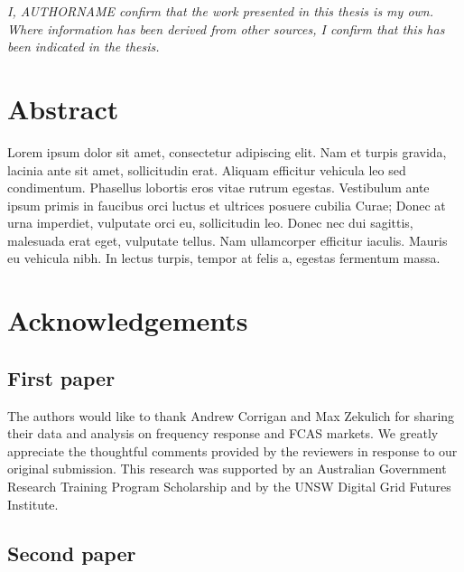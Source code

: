 \documentclass[12pt,a4paper,]{report}
\begin{document}
\vspace*{\fill}

\noindent \textit{
I, AUTHORNAME confirm that the work presented in this thesis is my own. Where information has been derived from other sources, I confirm that this has been indicated in the thesis.
} \vspace*{\fill}  \newpage

\hypertarget{abstract}{%
\chapter*{Abstract}\label{abstract}}

Lorem ipsum dolor sit amet, consectetur adipiscing elit. Nam et turpis
gravida, lacinia ante sit amet, sollicitudin erat. Aliquam efficitur
vehicula leo sed condimentum. Phasellus lobortis eros vitae rutrum
egestas. Vestibulum ante ipsum primis in faucibus orci luctus et
ultrices posuere cubilia Curae; Donec at urna imperdiet, vulputate orci
eu, sollicitudin leo. Donec nec dui sagittis, malesuada erat eget,
vulputate tellus. Nam ullamcorper efficitur iaculis. Mauris eu vehicula
nibh. In lectus turpis, tempor at felis a, egestas fermentum massa.

\setcounter{page}{1}

\hypertarget{acknowledgements}{%
\chapter*{Acknowledgements}\label{acknowledgements}}

\hypertarget{first-paper}{%
\section*{First paper}\label{first-paper}}

The authors would like to thank Andrew Corrigan and Max Zekulich for
sharing their data and analysis on frequency response and FCAS markets.
We greatly appreciate the thoughtful comments provided by the reviewers
in response to our original submission. This research was supported by
an Australian Government Research Training Program Scholarship and by
the UNSW Digital Grid Futures Institute.

\hypertarget{second-paper}{%
\section*{Second paper}\label{second-paper}}
\end{document}
